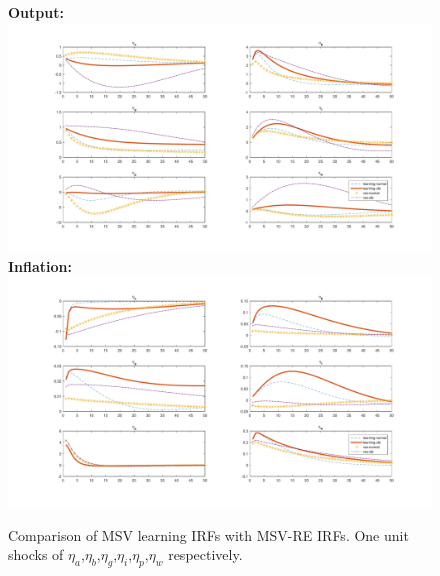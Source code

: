 \documentclass[12pt,reqno]{article}
\numberwithin{equation}{section}
\begin{document}

\begin{figure}[H]
\caption{Comparison of MSV learning IRFs with MSV-RE IRFs. One unit shocks of $\eta_a$,$\eta_b$,$\eta_g$,$\eta_i$,$\eta_p$,$\eta_w$ respectively.}
\label{irf_msv_2}
\textbf{Output:}\\
\includegraphics[scale=0.5]{MSV_impresp_output_riseComp.pdf}
\textbf{Inflation:}\\
\includegraphics[scale=0.5]{MSV_impresp_pinf_riseComp.pdf}
\end{figure}
\end{document}
